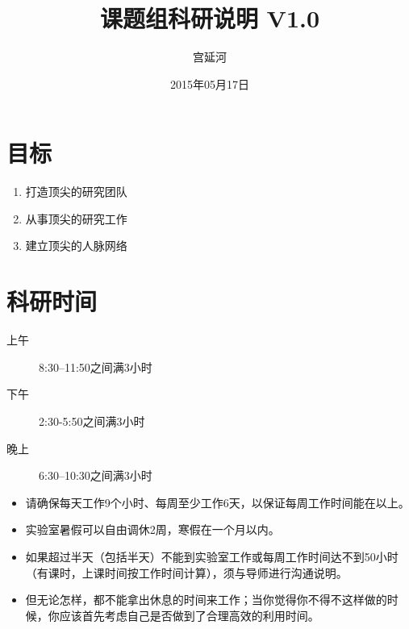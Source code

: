 \documentclass[a4paper，12pt]{article}
\title{课题组科研说明 V1.0} %
\author{宫延河}
\date{2015年05月17日} %
\begin{document}
\maketitle

%

\section{目标}

\begin{enumerate}

\item 打造顶尖的研究团队

\item 从事顶尖的研究工作

\item 建立顶尖的人脉网络

\end{enumerate}

\section{科研时间}

\begin{description}

\item[上午] 8:30--11:50之间满3小时

\item[下午] 2:30-5:50之间满3小时

\item[晚上] 6:30--10:30之间满3小时

\end{description}

\begin{itemize}

\item 请确保每天工作9个小时、每周至少工作6天，以保证每周工作时间能在{\color{red}{50小时}}以上。

\item 实验室暑假可以自由调休2周，寒假在一个月以内。

\item 如果超过半天（包括半天）不能到实验室工作或每周工作时间达不到50小时（有课时，上课时间按工作时间计算），须与导师进行沟通说明。

\item 但无论怎样，都不能拿出休息的时间来工作；当你觉得你不得不这样做的时候，你应该首先考虑自己是否做到了合理高效的利用时间。

\end{itemize}
\end{document}
